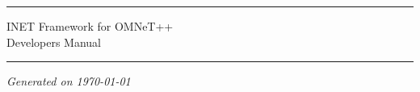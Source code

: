 

\begin{center}\end{center}
\vspace{16em}
\hrule
\vspace{2em}
\begin{center}
{\LARGE INET Framework for OMNeT++}\\
\vspace{1em}
{\large Developers Manual}\\
\end{center}
\vspace{2em}
\hrule


\vspace{8em}

\begin{center}
\textit{Generated on \today}
\end{center}



